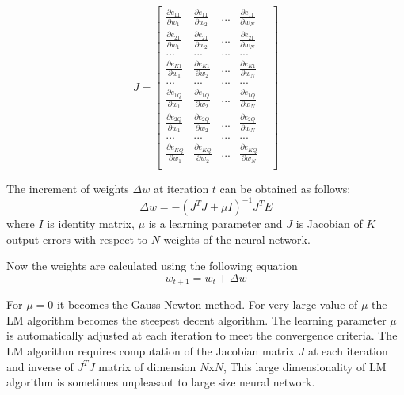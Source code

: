 \documentclass[12pt,a4paper,oneside]{article}
\numberwithin{equation}{section}
\numberwithin{algorithm}{section}
\begin{document}
\begin{equation}\label{jacobian_matrix}
J=
\begin{bmatrix}
\frac{\partial{e_{11}}}{\partial{w_{1}}} & \frac{\partial{e_{11}}}{\partial{w_{2}}} & ... & \frac{\partial{e_{11}}}{\partial{w_{N}}} \\

\frac{\partial{e_{21}}}{\partial{w_{1}}} & \frac{\partial{e_{21}}}{\partial{w_{2}}} & ... & \frac{\partial{e_{21}}}{\partial{w_{N}}} \\

...&...&...&...&\\

\frac{\partial{e_{K1}}}{\partial{w_{1}}} & \frac{\partial{e_{K1}}}{\partial{w_{2}}} & ... & \frac{\partial{e_{K1}}}{\partial{w_{N}}} \\

...&...&...&...&\\

\frac{\partial{e_{1Q}}}{\partial{w_{1}}} & \frac{\partial{e_{1Q}}}{\partial{w_{2}}} & ... & \frac{\partial{e_{1Q}}}{\partial{w_{N}}} \\

\frac{\partial{e_{2Q}}}{\partial{w_{1}}} & \frac{\partial{e_{2Q}}}{\partial{w_{2}}} & ... & \frac{\partial{e_{2Q}}}{\partial{w_{N}}} \\
...&...&...&...&\\

\frac{\partial{e_{KQ}}}{\partial{w_{1}}} & \frac{\partial{e_{KQ}}}{\partial{w_{2}}} & ... & \frac{\partial{e_{KQ}}}{\partial{w_{N}}} \\
\end{bmatrix}
\end{equation}

The increment of weights $\Delta{w}$ at iteration $t$ can be obtained as follows:
\begin{equation}\label{equation_delta_w}
\Delta{w}=-(J^TJ+\mu I)^{-1}J^TE
\end{equation}
where $I$ is identity matrix, $\mu$ is a learning parameter and $J$ is Jacobian of $K$ output errors with respect to $N$ weights of the neural network.

Now the weights are calculated using the following equation
\begin{equation}\label{equation_new_weight}
w_{t+1}=w_t+\Delta{w}
\end{equation}


For $\mu=0$ it becomes the Gauss-Newton method. For very large value of $\mu$ the LM algorithm becomes the steepest decent algorithm. The learning parameter $\mu$  is automatically adjusted at each iteration to meet the convergence criteria. The LM algorithm requires computation of the Jacobian matrix $J$ at each iteration and inverse of $J^TJ$ matrix of dimension $N$x$N$, This large dimensionality of LM algorithm is sometimes unpleasant to large size neural network.
\end{document}
